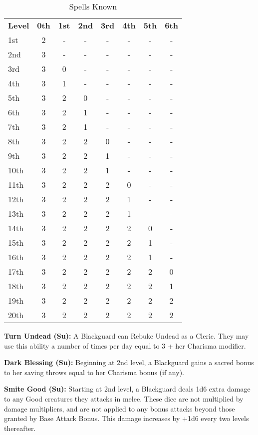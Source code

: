 \setlength{\intextsep}{-5pt}
\begin{wraptable}{O}{8.75cm}
\caption{\currentclassname{} Spells Known}
\begin{tabular}{l*{7}{c}}
\textbf{Level} & \textbf{0th} & \textbf{1st} & \textbf{2nd} & \textbf{3rd} & \textbf{4th} & \textbf{5th} & \textbf{6th} \\
1st & 2 & - & - & - & - & - & -\\
2nd & 3 & - & - & - & - & - & -\\
3rd & 3 & 0 & - & - & - & - & -\\
4th & 3 & 1 & - & - & - & - & -\\
5th & 3 & 2 & 0 & - & - & - & -\\
6th & 3 & 2 & 1 & - & - & - & -\\
7th & 3 & 2 & 1 & - & - & - & -\\
8th & 3 & 2 & 2 & 0 & - & - & -\\
9th & 3 & 2 & 2 & 1 & - & - & -\\
10th & 3 & 2 & 2 & 1 & - & - & -\\
11th & 3 & 2 & 2 & 2 & 0 & - & -\\
12th & 3 & 2 & 2 & 2 & 1 & - & -\\
13th & 3 & 2 & 2 & 2 & 1 & - & -\\
14th & 3 & 2 & 2 & 2 & 2 & 0 & -\\
15th & 3 & 2 & 2 & 2 & 2 & 1 & -\\
16th & 3 & 2 & 2 & 2 & 2 & 1 & -\\
17th & 3 & 2 & 2 & 2 & 2 & 2 & 0\\
18th & 3 & 2 & 2 & 2 & 2 & 2 & 1\\
19th & 3 & 2 & 2 & 2 & 2 & 2 & 2\\
20th & 3 & 2 & 2 & 2 & 2 & 2 & 2\\
\end{tabular}
\end{wraptable}

\textbf{Turn Undead (Su):} A Blackguard can Rebuke Undead as a Cleric. They may use this ability a number of times per day equal to 3 + her Charisma modifier.

\textbf{Dark Blessing (Su):} Beginning at 2nd level, a Blackguard gains a sacred bonus to her saving throws equal to her Charisma bonus (if any).

\textbf{Smite Good (Su):} Starting at 2nd level, a Blackguard deals 1d6 extra damage to any Good creatures they attacks in melee. These dice are not multiplied by damage multipliers, and are not applied to any bonus attacks beyond those granted by Base Attack Bonus. This damage increases by +1d6 every two levels thereafter.


